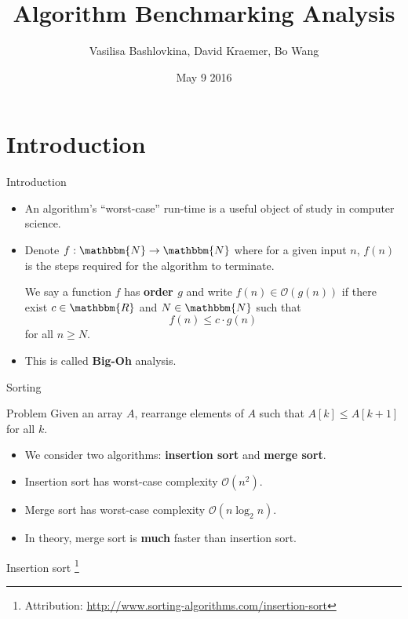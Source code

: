 \documentclass[]{beamer}
\title[MAT 336 Final Project]{Algorithm Benchmarking Analysis}
\author{Vasilisa Bashlovkina, David Kraemer, Bo Wang}
\date{May 9 2016}
\renewcommand{\emph}{\textbf}
\newcommand{\N}{\mathbbm{N}}
\newcommand{\R}{\mathbbm{R}}
\newcommand{\Order}{\mathcal{O}}
\begin{document}
\begin{frame}
\titlepage
\end{frame}

\section{Introduction}


\begin{frame}[t]{Introduction}

\begin{itemize}
	\item An algorithm's ``worst-case'' run-time is a useful object of study in computer science.
    \item Denote $f : \N \to \N$ where for a given input $n$, $f(n)$ is the steps required for the algorithm to terminate.
    \begin{definition}
	We say a function $f$ has \emph{order $g$} and write $f(n) \in \Order(g(n))$ if there exist $c \in \R$ and $N \in \N$ such that
    \[
    f(n) \leq c \cdot g(n)
    \]
    for all $n \geq N$. 
	\end{definition}
    \item This is called \emph{Big-Oh} analysis.
\end{itemize}
\end{frame}

\begin{frame}[t]{Sorting}
\begin{block}{Problem}
Given an array $A$, rearrange elements of $A$ such that $A[k] \leq A[k+1]$ for all $k$.
\end{block}
\begin{itemize}
	\item We consider two algorithms: \emph{insertion sort} and \emph{merge sort}.
    \item Insertion sort has worst-case complexity $\Order(n^2)$.
    \item Merge sort has worst-case complexity $\Order(n \log_2 n)$.
    \item In theory, merge sort is \emph{much} faster than insertion sort.
\end{itemize}
\end{frame}

\begin{frame}[t]{Insertion sort}
    \centering
    \footnote{Attribution: \url{http://www.sorting-algorithms.com/insertion-sort}}
\end{frame}
\end{document}
